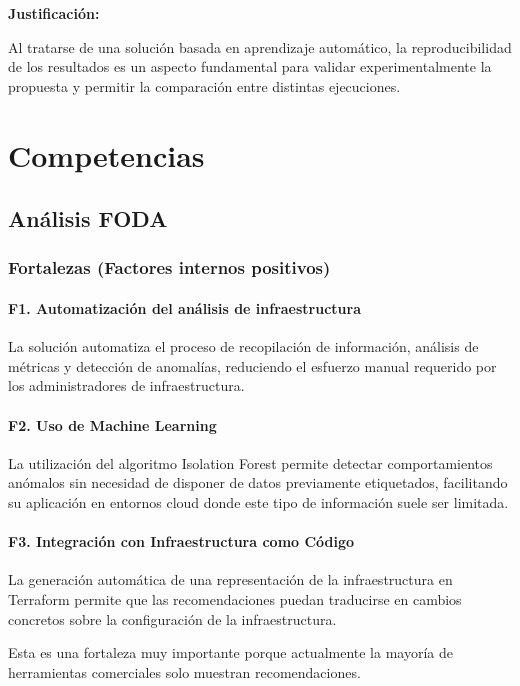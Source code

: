 \noindent \textbf{Justificación:}

Al tratarse de una solución basada en aprendizaje automático, la reproducibilidad de los resultados es un aspecto fundamental para validar experimentalmente la propuesta y permitir la comparación entre distintas ejecuciones.

\section{Competencias}

\subsection{Análisis FODA}

\subsubsection{Fortalezas (Factores internos positivos)}

\paragraph*{F1. Automatización del análisis de infraestructura}

La solución automatiza el proceso de recopilación de información, análisis de métricas y detección de anomalías, reduciendo el esfuerzo manual requerido por los administradores de infraestructura.

\paragraph*{F2. Uso de Machine Learning}

La utilización del algoritmo Isolation Forest permite detectar comportamientos anómalos sin necesidad de disponer de datos previamente etiquetados, facilitando su aplicación en entornos cloud donde este tipo de información suele ser limitada.

\paragraph*{F3. Integración con Infraestructura como Código}

La generación automática de una representación de la infraestructura en Terraform permite que las recomendaciones puedan traducirse en cambios concretos sobre la configuración de la infraestructura.

Esta es una fortaleza muy importante porque actualmente la mayoría de herramientas comerciales solo muestran recomendaciones.

